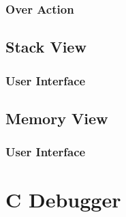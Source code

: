 \subsubsection{Over Action}

\subsection{Stack View}

\subsubsection{User Interface}

\subsection{Memory View}

\subsubsection{User Interface}

\section{C Debugger}